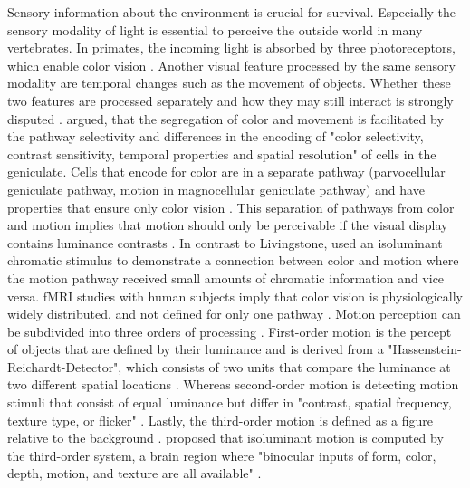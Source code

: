 
Sensory information about the environment is crucial for survival. Especially the sensory modality of light is essential to perceive the outside world in many vertebrates. In primates, the incoming light is absorbed by three photoreceptors, which enable color vision \parencite{robert1977retinalcones}. Another visual feature processed by the same sensory modality are temporal changes such as the movement of objects. Whether these two features are processed separately and how they may still interact is strongly disputed \parencite{GEGENFURTNER1996394}. \textcite{margaret1988segregationcolormovement} argued, that the segregation of color and movement is facilitated by the pathway selectivity and differences in the encoding of "color selectivity, contrast sensitivity, temporal properties and spatial resolution" of cells in the geniculate. Cells that encode for color are in a separate pathway (parvocellular geniculate pathway, motion in magnocellular geniculate pathway) and have properties that ensure only color vision \parencite{margaret1988segregationcolormovement}. This separation of pathways from color and motion implies that motion should only be perceivable if the visual display contains luminance contrasts \parencite{MULLEN1992colormotion}. In contrast to Livingstone, \textcite{MULLEN1992colormotion} used an isoluminant chromatic stimulus to demonstrate a connection between color and motion where the motion pathway received small amounts of chromatic information and vice versa. fMRI studies with human subjects imply that color vision is physiologically widely distributed, and not defined for only one pathway \parencite{WANDELL1999fmricolor}. Motion perception can be subdivided into three orders of processing \parencite{zhong1999isoluminant}. First-order motion is the percept of objects that are defined by their luminance and is derived from a "Hassenstein-Reichardt-Detector", which consists of two units that compare the luminance at two different spatial locations \parencite{Lu:2001, BORST2011974}. Whereas second-order motion is detecting motion stimuli that consist of equal luminance but differ in "contrast, spatial frequency, texture type, or flicker" \parencite{Lu:2001}. Lastly, the third-order motion is defined as a figure relative to the background \parencite{zhong1999isoluminant}. \textcite{zhong1999isoluminant} proposed that isoluminant motion is computed by the third-order system, a brain region where "binocular inputs of form, color, depth, motion, and texture are all available" \parencite{zhong1999isoluminant}. 

